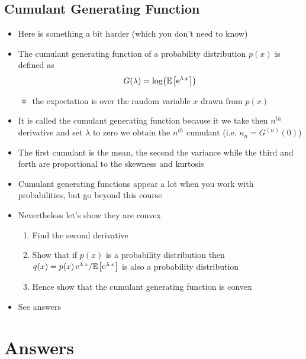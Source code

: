 \documentclass[11pt]{article}
\newcommand{\av}[2][]{\mathbb{E}_{#1\!}\left[ #2 \right]}
\newcommand{\logg}[1]{\log\!\left( #1 \right)}
\newcommand{\e}[1]{{\rm e}^{#1}}
\begin{document}
\subsection{Cumulant Generating Function}
\label{sec:orga2b633d}
\begin{itemize}
\item Here is something a bit harder (which you don't need to know)
\item The cumulant generating function of a probability distribution
\(p(x)\) is defined as
$$ G(\lambda) = \logg{\av{\e{\lambda\,x}}} $$
\begin{itemize}
\item the expectation is over the random variable \(x\) drawn from \(p(x)\)
\end{itemize}
\item It is called the cumulant generating function because it we take
then \(n^{th}\) derivative and set \(\lambda\) to zero we obtain the
\(n^{th}\) cumulant (i.e. \(\kappa_n = G^{(n)}(0)\))
\item The first cumulant is the mean, the second the variance while the
third and forth are proportional to the skewness and kurtosis
\item Cumulant generating functions appear a lot when you work with
probabilities, but go beyond this course
\item Nevertheless let's show they are convex
\begin{enumerate}
\item Find the second derivative
\item Show that if \(p(x)\) is a probability distribution then \(q(x) =
        p(x)\,\e{\lambda\,x}/\av{\e{\lambda\,x}}\) is also a
probability distribution
\item Hence show that the cumulant generating function is convex
\end{enumerate}
\item See answers
\end{itemize}


\section{Answers}
\label{sec:orgceca777}
\end{document}
